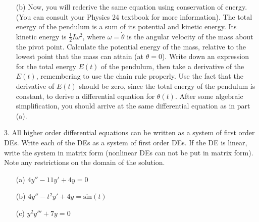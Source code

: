 \documentclass[12pt,letterpaper]{hmcpset}
\begin{document}
\begin{problem}
\begin{enumerate}
    \item[(b)] Now, you will rederive the same equation using conservation of energy. (You can consult
your Physics 24 textbook for more information). The total energy of the pendulum is
a sum of its potential and kinetic energy. Its kinetic energy is $\frac{1}{2}I\omega^2$, where $\omega = \dot{\theta}$ is the angular velocity of the mass about the pivot point. Calculate the potential energy
of the mass, relative to the lowest point that the mass can attain (at $\theta = 0$). Write down an expression for the total energy $E(t)$ of the pendulum, then take a derivative of
the $E(t)$, remembering to use the chain rule properly. Use the fact that the derivative
of $E(t)$ should be zero, since the total energy of the pendulum is constant, to derive a
differential equation for $\theta(t)$. After some algebraic simplification, you should arrive at
the same differential equation as in part (a).
\end{enumerate}

\end{problem}
\newpage


\begin{problem}
3. All higher order differential equations can be written as a system of first order DEs. Write
each of the DEs as a system of first order DEs. If the DE is linear, write the system in
matrix form (nonlinear DEs can not be put in matrix form). Note any restrictions on the
domain of the solution.

\begin{enumerate}
    \item[(a)] $4y'' - 11y' + 4y = 0$
    \item[(b)] 4$y'' - t^2y' + 4y = \text{sin} (t)$
    \item[(c)] $y^2y''' + 7y = 0$
\end{enumerate}

\end{problem}
\newpage
\end{document}
